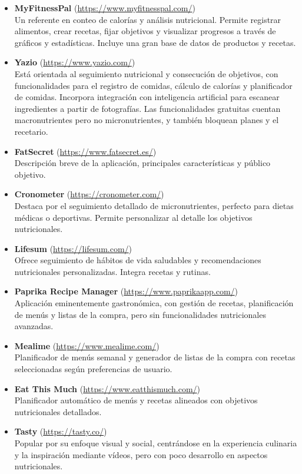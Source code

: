 \begin{itemize}
  \item \textbf{MyFitnessPal} (\url{https://www.myfitnesspal.com/})\\
  Un referente en conteo de calorías y análisis nutricional. Permite registrar alimentos, crear recetas, fijar objetivos y visualizar progresos a través de gráficos y estadísticas. Incluye una gran base de datos de productos y recetas.

  \item \textbf{Yazio} (\url{https://www.yazio.com/})\\
  Está orientada al seguimiento nutricional y consecución de objetivos, con funcionalidades para el registro de comidas, cálculo de calorías y planificador de comidas. Incorpora integración con inteligencia artificial para escanear ingredientes a partir de fotografías. Las funcionalidades gratuitas cuentan macronutrientes pero no micronutrientes, y también bloquean planes y el recetario.

  \item \textbf{FatSecret} (\url{https://www.fatsecret.es/})\\
  Descripción breve de la aplicación, principales características y público objetivo.

  \item \textbf{Cronometer} (\url{https://cronometer.com/})\\
  Destaca por el seguimiento detallado de micronutrientes, perfecto para dietas médicas o deportivas. Permite personalizar al detalle los objetivos nutricionales.

  \item \textbf{Lifesum} (\url{https://lifesum.com/})\\
  Ofrece seguimiento de hábitos de vida saludables y recomendaciones nutricionales personalizadas. Integra recetas y rutinas.

  \item \textbf{Paprika Recipe Manager} (\url{https://www.paprikaapp.com/})\\
  Aplicación eminentemente gastronómica, con gestión de recetas, planificación de menús y listas de la compra, pero sin funcionalidades nutricionales avanzadas.

  \item \textbf{Mealime} (\url{https://www.mealime.com/})\\
  Planificador de menús semanal y generador de listas de la compra con recetas seleccionadas según preferencias de usuario.

  \item \textbf{Eat This Much} (\url{https://www.eatthismuch.com/})\\
  Planificador automático de menús y recetas alineados con objetivos nutricionales detallados.

  \item \textbf{Tasty} (\url{https://tasty.co/})\\
  Popular por su enfoque visual y social, centrándose en la experiencia culinaria y la inspiración mediante vídeos, pero con poco desarrollo en aspectos nutricionales.
\end{itemize}


